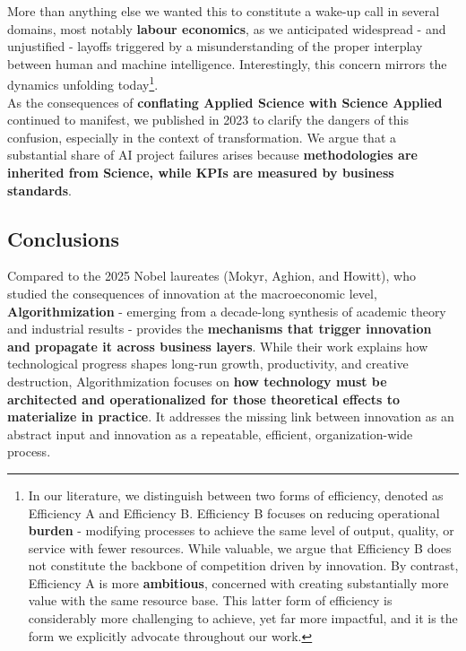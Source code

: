 \documentclass{article}
\begin{document}
More than anything else we wanted this to constitute a wake-up call in several domains, most notably \textbf{labour economics}, as we anticipated widespread - and unjustified - layoffs triggered by a misunderstanding of the proper interplay between human and machine intelligence. Interestingly, this concern mirrors the dynamics unfolding today\footnote{In our literature, we distinguish between two forms of efficiency, denoted as Efficiency A and Efficiency B. Efficiency B focuses on reducing operational \textbf{burden} - modifying processes to achieve the same level of output, quality, or service with fewer resources. While valuable, we argue that Efficiency B does not constitute the backbone of competition driven by innovation. By contrast, Efficiency A is more \textbf{ambitious}, concerned with creating substantially more value with the same resource base. This latter form of efficiency is considerably more challenging to achieve, yet far more impactful, and it is the form we explicitly advocate throughout our work.}.\\

As the consequences of \textbf{conflating Applied Science with Science Applied} continued to manifest, we published \cite{Advances in AI} in 2023 to clarify the dangers of this confusion, especially in the context of transformation. We argue that a substantial share of AI project failures arises because \textbf{methodologies are inherited from Science, while KPIs are measured by business standards}.\\


\subsection{Conclusions}
\label{subsection: Conclusions 2}

Compared to the 2025 Nobel laureates (Mokyr, Aghion, and Howitt), who studied the consequences of innovation at the macroeconomic level, \textbf{Algorithmization} - emerging from a decade-long synthesis of academic theory and industrial results - provides the \textbf{mechanisms that trigger innovation and propagate it across business layers}. While their work explains how technological progress shapes long-run growth, productivity, and creative destruction, Algorithmization focuses on \textbf{how technology must be architected and operationalized for those theoretical effects to materialize in practice}. It addresses the missing link between innovation as an abstract input and innovation as a repeatable, efficient, organization-wide process.\\
\end{document}
